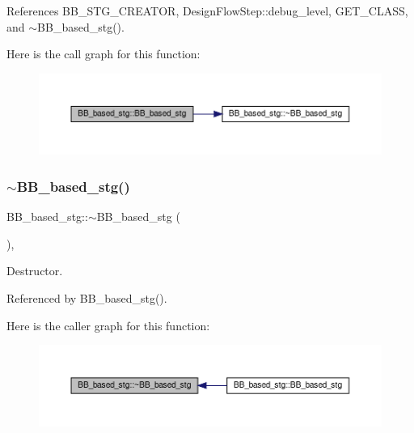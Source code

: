 References B\+B\+\_\+\+S\+T\+G\+\_\+\+C\+R\+E\+A\+T\+OR, Design\+Flow\+Step\+::debug\+\_\+level, G\+E\+T\+\_\+\+C\+L\+A\+SS, and $\sim$\+B\+B\+\_\+based\+\_\+stg().

Here is the call graph for this function\+:
\nopagebreak
\begin{figure}[H]
\begin{center}
\leavevmode
\includegraphics[width=350pt]{dd/d84/classBB__based__stg_a27b4e9f2b0bf76564a5eafc1b72e69f1_cgraph}
\end{center}
\end{figure}
\mbox{\label{classBB__based__stg_a92039360b8abd4fbb1717effc57afd4e}} 
\subsubsection{\texorpdfstring{$\sim$\+B\+B\+\_\+based\+\_\+stg()}{~BB\_based\_stg()}}
{\footnotesize\ttfamily B\+B\+\_\+based\+\_\+stg\+::$\sim$\+B\+B\+\_\+based\+\_\+stg (\begin{DoxyParamCaption}{ }\end{DoxyParamCaption})\hspace{0.3cm}{\ttfamily [override]}, {\ttfamily [default]}}



Destructor. 



Referenced by B\+B\+\_\+based\+\_\+stg().

Here is the caller graph for this function\+:
\nopagebreak
\begin{figure}[H]
\begin{center}
\leavevmode
\includegraphics[width=350pt]{dd/d84/classBB__based__stg_a92039360b8abd4fbb1717effc57afd4e_icgraph}
\end{center}
\end{figure}


